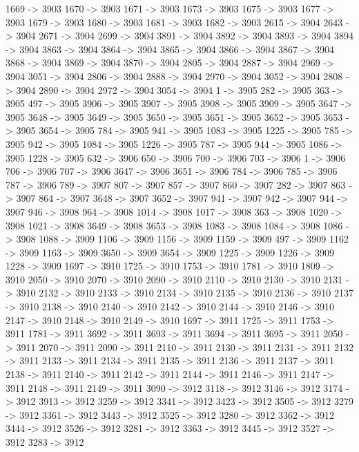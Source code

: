 {	1669 -> 3903
	1670 -> 3903
	1671 -> 3903
	1673 -> 3903
	1675 -> 3903
	1677 -> 3903
	1679 -> 3903
	1680 -> 3903
	1681 -> 3903
	1682 -> 3903
	2615 -> 3904
	2643 -> 3904
	2671 -> 3904
	2699 -> 3904
	3891 -> 3904
	3892 -> 3904
	3893 -> 3904
	3894 -> 3904
	3863 -> 3904
	3864 -> 3904
	3865 -> 3904
	3866 -> 3904
	3867 -> 3904
	3868 -> 3904
	3869 -> 3904
	3870 -> 3904
	2805 -> 3904
	2887 -> 3904
	2969 -> 3904
	3051 -> 3904
	2806 -> 3904
	2888 -> 3904
	2970 -> 3904
	3052 -> 3904
	2808 -> 3904
	2890 -> 3904
	2972 -> 3904
	3054 -> 3904
	1 -> 3905
	282 -> 3905
	363 -> 3905
	497 -> 3905
	3906 -> 3905
	3907 -> 3905
	3908 -> 3905
	3909 -> 3905
	3647 -> 3905
	3648 -> 3905
	3649 -> 3905
	3650 -> 3905
	3651 -> 3905
	3652 -> 3905
	3653 -> 3905
	3654 -> 3905
	784 -> 3905
	941 -> 3905
	1083 -> 3905
	1225 -> 3905
	785 -> 3905
	942 -> 3905
	1084 -> 3905
	1226 -> 3905
	787 -> 3905
	944 -> 3905
	1086 -> 3905
	1228 -> 3905
	632 -> 3906
	650 -> 3906
	700 -> 3906
	703 -> 3906
	1 -> 3906
	706 -> 3906
	707 -> 3906
	3647 -> 3906
	3651 -> 3906
	784 -> 3906
	785 -> 3906
	787 -> 3906
	789 -> 3907
	807 -> 3907
	857 -> 3907
	860 -> 3907
	282 -> 3907
	863 -> 3907
	864 -> 3907
	3648 -> 3907
	3652 -> 3907
	941 -> 3907
	942 -> 3907
	944 -> 3907
	946 -> 3908
	964 -> 3908
	1014 -> 3908
	1017 -> 3908
	363 -> 3908
	1020 -> 3908
	1021 -> 3908
	3649 -> 3908
	3653 -> 3908
	1083 -> 3908
	1084 -> 3908
	1086 -> 3908
	1088 -> 3909
	1106 -> 3909
	1156 -> 3909
	1159 -> 3909
	497 -> 3909
	1162 -> 3909
	1163 -> 3909
	3650 -> 3909
	3654 -> 3909
	1225 -> 3909
	1226 -> 3909
	1228 -> 3909
	1697 -> 3910
	1725 -> 3910
	1753 -> 3910
	1781 -> 3910
	1809 -> 3910
	2050 -> 3910
	2070 -> 3910
	2090 -> 3910
	2110 -> 3910
	2130 -> 3910
	2131 -> 3910
	2132 -> 3910
	2133 -> 3910
	2134 -> 3910
	2135 -> 3910
	2136 -> 3910
	2137 -> 3910
	2138 -> 3910
	2140 -> 3910
	2142 -> 3910
	2144 -> 3910
	2146 -> 3910
	2147 -> 3910
	2148 -> 3910
	2149 -> 3910
	1697 -> 3911
	1725 -> 3911
	1753 -> 3911
	1781 -> 3911
	3692 -> 3911
	3693 -> 3911
	3694 -> 3911
	3695 -> 3911
	2050 -> 3911
	2070 -> 3911
	2090 -> 3911
	2110 -> 3911
	2130 -> 3911
	2131 -> 3911
	2132 -> 3911
	2133 -> 3911
	2134 -> 3911
	2135 -> 3911
	2136 -> 3911
	2137 -> 3911
	2138 -> 3911
	2140 -> 3911
	2142 -> 3911
	2144 -> 3911
	2146 -> 3911
	2147 -> 3911
	2148 -> 3911
	2149 -> 3911
	3090 -> 3912
	3118 -> 3912
	3146 -> 3912
	3174 -> 3912
	3913 -> 3912
	3259 -> 3912
	3341 -> 3912
	3423 -> 3912
	3505 -> 3912
	3279 -> 3912
	3361 -> 3912
	3443 -> 3912
	3525 -> 3912
	3280 -> 3912
	3362 -> 3912
	3444 -> 3912
	3526 -> 3912
	3281 -> 3912
	3363 -> 3912
	3445 -> 3912
	3527 -> 3912
	3283 -> 3912
}
